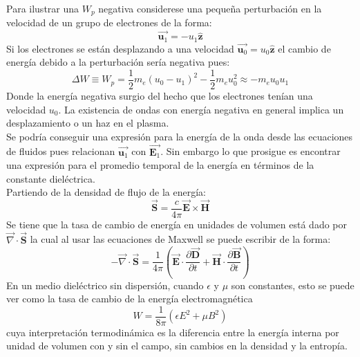 \documentclass[../tesis_main_file.tex]{subfiles}
\begin{document}
Para ilustrar una $W_p$ negativa considerese una pequeña perturbación en la velocidad de un grupo de electrones de la forma:
\begin{equation}
\overrightarrow{\textbf{u}_1}=-u_1\widehat{\textbf{z}}
\end{equation}
Si los electrones se están desplazando a una velocidad $\overrightarrow{\textbf{u}_0}=u_0\widehat{\textbf{z}}$ el cambio de energía debido a la perturbación sería negativa pues:
\begin{equation}
\Delta W \equiv W_p = \frac{1}{2}m_e(u_0-u_1)^2-\frac{1}{2}m_eu_0^2\approx-m_eu_0u_1
\end{equation}
Donde la energía negativa surgio del hecho que los electrones tenían una velocidad $u_0$. La existencia de ondas con energía negativa en general implica un desplazamiento o un haz en el plasma.\\
Se podría conseguir una expresión para la energía de la onda desde las ecuaciones de fluidos pues relacionan $\overrightarrow{\textbf{u}_1}$ con $\overrightarrow{\textbf{E}_1}$. Sin embargo lo que prosigue es encontrar una expresión para el promedio temporal de la energía en términos de la constante dieléctrica.\\
Partiendo de la densidad de flujo de la energía:
\begin{equation}
\overrightarrow{\textbf{S}}= \frac{c}{4 \pi}\overrightarrow{\textbf{E}}\times \overrightarrow{\textbf{H}}
\end{equation}
Se tiene que la tasa de cambio de energía en unidades de volumen está dado por $\overrightarrow{\nabla} \cdot \overrightarrow{\textbf{S}}$ la cual al usar las ecuaciones de Maxwell se puede escribir de la forma:
\begin{equation}
\label{eq:tasa_cambio_energia_em_por_volumen}
-\overrightarrow{\nabla} \cdot \overrightarrow{\textbf{S}}= \frac{1}{4 \pi}\left(\overrightarrow{\textbf{E}}\cdot \frac{\partial \overrightarrow{\textbf{D}}}{\partial t} + \overrightarrow{\textbf{H}}\cdot \frac{\partial \overrightarrow{\textbf{B}}}{\partial t} \right)
\end{equation}
En un medio dieléctrico sin dispersión, cuando $\epsilon$ y $\mu$ son constantes, esto se puede ver como la tasa de cambio de la energía electromagnética
\begin{equation}
W = \frac{1}{8\pi}\left(\epsilon E^2 +\mu B^2\right)
\end{equation}
cuya interpretación termodinámica es la diferencia entre la energía interna por unidad de volumen con y sin el campo, sin cambios en la densidad y la entropía. \cite{Landau1690Electro_media}\\
\end{document}

